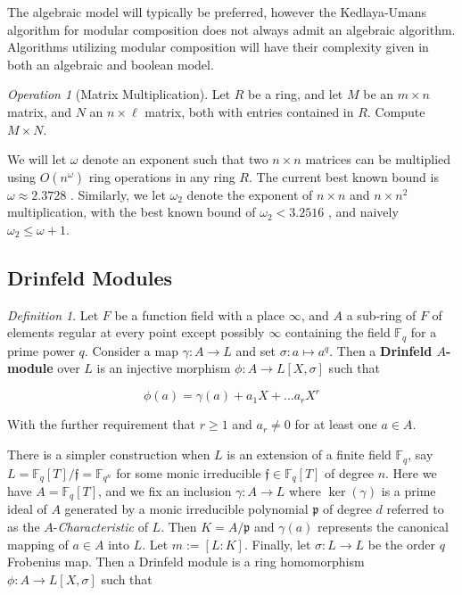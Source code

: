 \documentclass{jams-l}
\theoremstyle{remark}
\numberwithin{equation}{section}
\newtheorem{definition}{Definition}
\newtheorem{operation}{Operation}
\newcommand{\frakf}{\mathfrak{f}}
\begin{document}
The algebraic model will typically be preferred, however the Kedlaya-Umans algorithm for modular composition does not always admit an algebraic algorithm. Algorithms utilizing modular composition will have their complexity given in both an algebraic and boolean model.

\begin{operation}[Matrix Multiplication]

Let $R$ be a ring, and let $M$ be an $m\times n$ matrix, and $N$ an $n \times \ell$ matrix, both with entries contained in $R$. Compute $M\times N$.

\end{operation}

We will let $\omega$ denote an exponent such that two $n\times n$ matrices can be multiplied using $O(n^{\omega})$ ring operations in any ring $R$. The current best known bound is $\omega \approx 2.3728$ \cite{DBLP:journals/corr/abs-1708-05622}. Similarly, we let $\omega_2$ denote the exponent of $n \times n$ and $n \times n^2$ multiplication, with the best known bound of $\omega_2 < 3.2516$ \cite{DBLP:journals/corr/abs-1708-05622}, and naively $\omega_2 \leq \omega + 1$.

\subsection{Drinfeld Modules}

\begin{definition}

Let $F$ be a function field with a place $\infty$, and $A$ a sub-ring of $F$ of elements regular at every point except possibly $\infty$ containing the field $\mathbb{F}_q$ for a prime power $q$. Consider a map $\gamma : A \to L$ and set $\sigma : a \mapsto a^q$. Then a \textbf{Drinfeld $A$-module} over $L$ is an injective morphism $\phi: A \to L[X,\sigma]$ such that 

\[\phi(a) = \gamma(a) + a_1 X + \ldots a_rX^r \]

\noindent With the further requirement that $r \geq 1 $ and $a_r \neq 0$ for at least one $a \in A$.

\end{definition}

There is a simpler construction when $L$ is an extension of a finite field $\mathbb{F}_q$, say $L = \mathbb{F}_q[T]/\mathfrak{f} = \mathbb{F}_{q^n}$ for some monic irreducible  $\frakf \in \mathbb{F}_q[T]$ of degree $n$. Here we have $A = \mathbb{F}_{q}[T]$, and we fix an inclusion $\gamma: A \to L$ where $\ker(\gamma)$ is a prime ideal of $A$ generated by a monic irreducible polynomial $\mathfrak{p}$ of degree $d$ referred to as the $A$-\textit{Characteristic} of $L$. Then $K = A/\mathfrak{p}$ and $\gamma(a)$ represents the canonical mapping of $a \in A$ into $L$. Let $m := [L : K]$. Finally, let $\sigma : L \to L$ be the order $q$ Frobenius map. Then a Drinfeld module is a ring homomorphism $\phi: A \to L[X,\sigma]$ such that 
\end{document}
